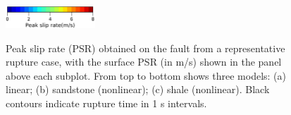 {}
\begin{figure}[!ht]
     \\[\baselineskip]%
     \\[\baselineskip]%
     \\[\baselineskip]%
    \vspace{-3mm}
    \centering
    \includegraphics[width=0.3\textwidth]{figures/figure_eks_1d.png}\label{fig:eks-1d}
    \caption{Peak slip rate (PSR) obtained on the fault from a representative rupture case, with the surface PSR (in m/s) shown in the panel above each subplot. From top to bottom shows three models: (a) linear; (b) sandstone (nonlinear); (c) shale (nonlinear). Black contours indicate rupture time in 1 s intervals.}
    \label{fig:eks-1}
\end{figure}
\clearpage

